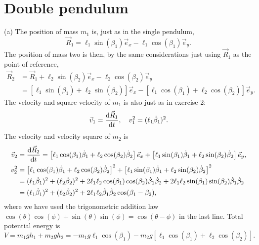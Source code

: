 \documentclass{article}
\begin{document}
    \section{Double pendulum}
        (a) The position of mass $m_1$ is, just as in the single pendulum, 
        \begin{equation*}
            \vec R_1 = \ell_1 \sin(\beta_1) \vec e_x - \ell_1 \cos(\beta_1) \vec e_y.
        \end{equation*}
        The position of mass two is then, by the same considerations just using $\vec R_1$ as the point of reference,
        \begin{align*}
            \vec R_2 & = \vec R_1 + \ell_2 \sin(\beta_2) \vec e_x - \ell_2 \cos(\beta_2) \vec e_y \\
            &= \left[\ell_1 \sin(\beta_1) + \ell_2 \sin(\beta_2)\right] \vec e_x - \left[\ell_1 \cos(\beta_1) + \ell_2 \cos(\beta_2)\right] \vec e_y.
        \end{align*}
        The velocity and square velocity of $m_1$ is also just as in exercise 2:
        \begin{equation*}
            \vec v_1 = \dv{\vec R_1}{t}, \quad v_1^2 = (\ell_1 \dot \beta_1)^2.
        \end{equation*}
        The velocity  and velocity square of $m_2$ is
        \begin{align*}
            \vec v_2 &= \dv{\vec R_2}{t} = 
            \left[\ell_1 \cos(\beta_1) \dot \beta_1 + \ell_2 \cos(\beta_2) \dot \beta_2 \right] \vec e_x + \left[\ell_1 \sin(\beta_1) \dot \beta_1 + \ell_2 \sin(\beta_2) \dot \beta_2\right] \vec e_y, \\
            v_2^2 &= \left[\ell_1 \cos(\beta_1) \dot \beta_1 + \ell_2 \cos(\beta_2) \dot \beta_2 \right]^2 + \left[\ell_1 \sin(\beta_1) \dot \beta_1 + \ell_2 \sin(\beta_2) \dot \beta_2\right]^2 \\ 
            &= (\ell_1 \dot \beta_1)^2 + (\ell_2 \dot \beta_2)^2 + 2 \ell_1 \ell_2 \cos(\beta_1)\cos(\beta_2) \dot \beta_1 \dot \beta_2 + 2 \ell_1 \ell_2 \sin(\beta_1)\sin(\beta_2) \dot \beta_1 \dot \beta_2 \\
            &= (\ell_1 \dot \beta_1)^2 + (\ell_2 \dot \beta_2)^2 + 2 \ell_1 \ell_2 \dot \beta_1 \dot \beta_2 \cos(\beta_1 - \beta_2),
        \end{align*}
        where we have used the trigonometric addition law $\cos(\theta) \cos(\phi) + \sin(\theta) \sin(\phi) = \cos(\theta - \phi)$ in the last line. Total potential energy is 
        \begin{equation*}
            V = m_1 g h_1 + m_2 g h_2 = -m_1 g \ell_1 \cos(\beta_1) - m_2 g \left[\ell_1 \cos(\beta_1) + \ell_2 \cos(\beta_2)\right].
        \end{equation*}
\end{document}
